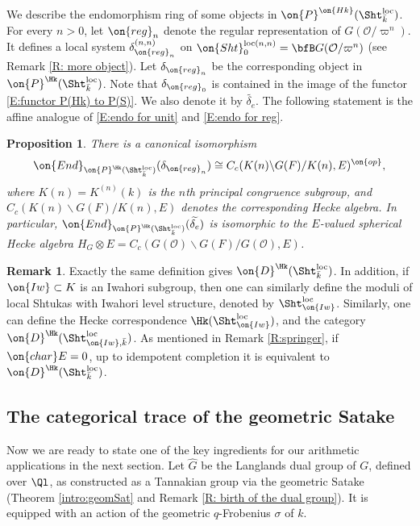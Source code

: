 \documentclass[11pt]{amsart}
\newtheorem{prop}[thm]{Proposition}
\theoremstyle{definition}
\theoremstyle{definition}
\newtheorem{rmk}[thm]{Remark}
\theoremstyle{definition}
\numberwithin{equation}{subsection}
\newcommand{\mO}{{\mathcal O}}
\newcommand{\cha}{{\on{char}}}
\newcommand{\End}{{\on{End}}}
\newcommand{\loc}{\mathrm{loc}}
\begin{document}
We describe the endomorphism ring of some objects in $\on{P}^{\on{Hk}}(\Sht^\loc_{\bar k})$. 
For every $n>0$, let $\on{reg}_n$ denote the regular representation of $G(\mO/\varpi^n)$. It defines a local system
$\delta_{\on{reg}_n}^{(n,n)}$ on $\on{Sht}^{\loc(n,n)}_{0}=\bfB G(\mO/\varpi^n)$ (see Remark \ref{R: more object}). Let $\delta_{\on{reg}_n}$ be the corresponding object in $\on{P}^{\Hk}(\Sht^\loc_{\bar k})$.
Note that $\delta_{\on{reg}_0}$ is contained in the image of the functor \eqref{E:functor P(Hk) to P(S)}. We also denote it by $\widetilde{\delta_{e}}$.
The following statement is the affine analogue of \eqref{E:endo for unit} and \eqref{E:endo for reg}.
\begin{prop}
\label{P: endo of unit}
There is a canonical isomorphism
$$\End_{\on{P}^{\Hk}(\Sht^\loc_{\bar k})}(\delta_{\on{reg}_n})\cong C_c(K(n)\backslash G(F)/K(n),E)^{\on{op}},$$ where $K(n)=K^{(n)}(k)$ is the $n$th principal congruence subgroup, and  $ C_c(K(n)\backslash G(F)/K(n),E)$ denotes the corresponding Hecke algebra.
In particular,  $\End_{\on{P}^{\Hk}(\Sht^\loc_{\bar k})}(\widetilde{\delta_{e}})$ is isomorphic to the $E$-valued spherical Hecke algebra $H_G\otimes E=C_c(G(\mO)\backslash G(F)/G(\mO),E)$.
\end{prop}

\begin{rmk}
Exactly the same definition gives $\on{D}^\Hk(\Sht^{\loc}_{\bar k})$. In addition,
if $\on{Iw}\subset K$ is an Iwahori subgroup, then one can similarly define the moduli of local Shtukas with Iwahori level structure, denoted by $\Sht^{\loc}_{\on{Iw}}$. Similarly, one can define the Hecke correspondence $\Hk(\Sht^{\loc}_{\on{Iw}})$, and the category $\on{D}^\Hk(\Sht^{\loc}_{\on{Iw},\bar k})$. As mentioned in Remark \ref{R:springer}, if $\cha E=0$, up to idempotent completion it is equivalent to $\on{D}^\Hk(\Sht^{\loc}_{\bar k})$.
\end{rmk}


\subsection{The categorical trace of the geometric Satake}
Now we are ready to state one of the key ingredients for our arithmetic applications in the next section. Let $\hat G$ be the Langlands dual group of $G$, defined over $\Ql$, as constructed as a Tannakian group via the geometric Satake (Theorem \ref{intro:geomSat} and Remark \ref{R: birth of the dual group}). It is equipped with an action of the geometric $q$-Frobenius $\sigma$ of $k$.
\end{document}
